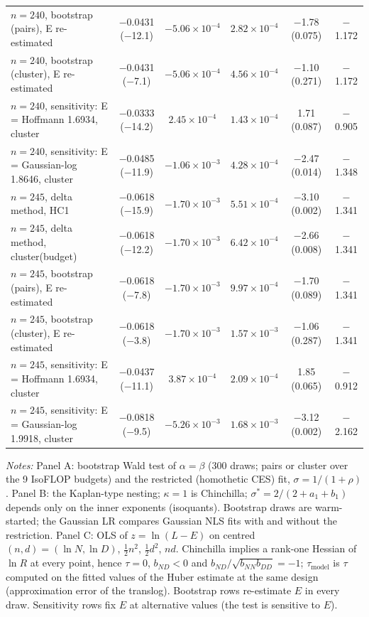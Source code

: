 \begin{table}[!htbp]
\begin{threeparttable}
\begin{tabular}{lccccc}
$n=240$, bootstrap (pairs), E re-estimated & $-$0.0431 ($-$12.1) & $-5.06\times10^{-4}$ & $2.82\times10^{-4}$ & $-$1.78 (0.075) & $-$1.172 \\
$n=240$, bootstrap (cluster), E re-estimated & $-$0.0431 ($-$7.1) & $-5.06\times10^{-4}$ & $4.56\times10^{-4}$ & $-$1.10 (0.271) & $-$1.172 \\
$n=240$, sensitivity: E = Hoffmann 1.6934, cluster & $-$0.0333 ($-$14.2) & $2.45\times10^{-4}$ & $1.43\times10^{-4}$ & 1.71 (0.087) & $-$0.905 \\
$n=240$, sensitivity: E = Gaussian-log 1.8646, cluster & $-$0.0485 ($-$11.9) & $-1.06\times10^{-3}$ & $4.28\times10^{-4}$ & $-$2.47 (0.014) & $-$1.348 \\
$n=245$, delta method, HC1 & $-$0.0618 ($-$15.9) & $-1.70\times10^{-3}$ & $5.51\times10^{-4}$ & $-$3.10 (0.002) & $-$1.341 \\
$n=245$, delta method, cluster(budget) & $-$0.0618 ($-$12.2) & $-1.70\times10^{-3}$ & $6.42\times10^{-4}$ & $-$2.66 (0.008) & $-$1.341 \\
$n=245$, bootstrap (pairs), E re-estimated & $-$0.0618 ($-$7.8) & $-1.70\times10^{-3}$ & $9.97\times10^{-4}$ & $-$1.70 (0.089) & $-$1.341 \\
$n=245$, bootstrap (cluster), E re-estimated & $-$0.0618 ($-$3.8) & $-1.70\times10^{-3}$ & $1.57\times10^{-3}$ & $-$1.06 (0.287) & $-$1.341 \\
$n=245$, sensitivity: E = Hoffmann 1.6934, cluster & $-$0.0437 ($-$11.1) & $3.87\times10^{-4}$ & $2.09\times10^{-4}$ & 1.85 (0.065) & $-$0.912 \\
$n=245$, sensitivity: E = Gaussian-log 1.9918, cluster & $-$0.0818 ($-$9.5) & $-5.26\times10^{-3}$ & $1.68\times10^{-3}$ & $-$3.12 (0.002) & $-$2.162 \\
\bottomrule
\end{tabular}
\begin{tablenotes}[flushleft]
\footnotesize
\item \textit{Notes:} Panel A: bootstrap Wald test of $\alpha=\beta$ (300 draws; pairs or cluster over the 9 IsoFLOP budgets) and the restricted (homothetic CES) fit, $\sigma=1/(1+\rho)$. Panel B: the Kaplan-type nesting; $\kappa=1$ is Chinchilla; $\sigma^*=2/(2+a_1+b_1)$ depends only on the inner exponents (isoquants). Bootstrap draws are warm-started; the Gaussian LR compares Gaussian NLS fits with and without the restriction. Panel C: OLS of $z=\ln(L-E)$ on centred $(n,d)=(\ln N,\ln D)$, $\tfrac12 n^2$, $\tfrac12 d^2$, $nd$. Chinchilla implies a rank-one Hessian of $\ln R$ at every point, hence $\tau=0$, $b_{ND}<0$ and $b_{ND}/\sqrt{b_{NN}b_{DD}}=-1$; $\tau_{\text{model}}$ is $\tau$ computed on the fitted values of the Huber estimate at the same design (approximation error of the translog). Bootstrap rows re-estimate $E$ in every draw. Sensitivity rows fix $E$ at alternative values (the test is sensitive to $E$).
\end{tablenotes}
\end{threeparttable}
\end{table}
